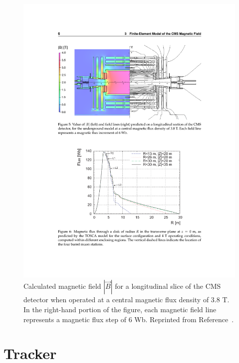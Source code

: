 \begin{figure}[h!]
	\centering
	\includegraphics[width=\linewidth]{Figures/Detector/magnet.pdf}
       \caption{Calculated magnetic field $|\vec{B}|$ for a longitudinal slice of the CMS detector when operated at a central magnetic flux density of 3.8 T. In the right-hand portion of the figure, each magnetic field line represents a magnetic flux step of 6 Wb. Reprinted from Reference~\cite{CMSMagnetField}.}
       \label{fig:magnet}
\end{figure}


\section{Tracker}
\label{sec:Tracker}

